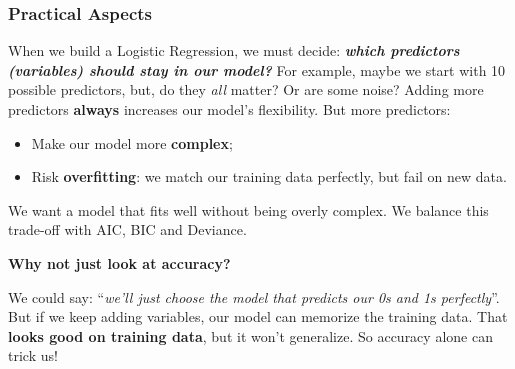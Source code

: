 \subsubsection{Practical Aspects}

When we build a Logistic Regression, we must decide: \textbf{\emph{which predictors (variables) should stay in our model?}} For example, maybe we start with 10 possible predictors, but, do they \emph{all} matter? Or are some noise? Adding more predictors \textbf{always} increases our model's flexibility. But more predictors:
\begin{itemize}
    \item Make our model more \textbf{complex};
    \item Risk \textbf{overfitting}: we match our training data perfectly, but fail on new data.
\end{itemize}
We want a model that fits well without being overly complex. We balance this trade-off with AIC, BIC and Deviance.

\highspace
\begin{flushleft}
    \textcolor{Green3}{ \textbf{Why not just look at accuracy?}}
\end{flushleft}
We could say: ``\emph{we'll just choose the model that predicts our 0s and 1s perfectly}''. But if we keep adding variables, our model can memorize the training data. That \textbf{looks good on training data}, but it won't generalize. So accuracy alone can trick us!

